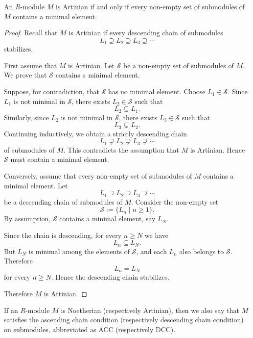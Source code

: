 \begin{lemma}
    An $R$-module $M$ is Artinian if and only if every non-empty set of
    submodules of $M$ contains a minimal element.
\end{lemma}

\begin{proof}
    Recall that $M$ is Artinian if every descending chain of submodules
    \[
        L_1 \supseteq L_2 \supseteq L_3 \supseteq \cdots
    \]
    stabilizes.

    First assume that $M$ is Artinian. Let $\mathcal{S}$ be a non-empty set
    of submodules of $M$. We prove that $\mathcal{S}$ contains a minimal
    element.

    Suppose, for contradiction, that $\mathcal{S}$ has no minimal element.
    Choose $L_1\in \mathcal{S}$. Since $L_1$ is not minimal in $\mathcal{S}$,
    there exists $L_2\in \mathcal{S}$ such that
    \[
        L_2 \subsetneq L_1.
    \]
    Similarly, since $L_2$ is not minimal in $\mathcal{S}$, there exists
    $L_3\in \mathcal{S}$ such that
    \[
        L_3 \subsetneq L_2.
    \]
    Continuing inductively, we obtain a strictly descending chain
    \[
        L_1 \supsetneq L_2 \supsetneq L_3 \supsetneq \cdots
    \]
    of submodules of $M$. This contradicts the assumption that $M$ is
    Artinian. Hence $\mathcal{S}$ must contain a minimal element.

    Conversely, assume that every non-empty set of submodules of $M$ contains
    a minimal element. Let
    \[
        L_1 \supseteq L_2 \supseteq L_3 \supseteq \cdots
    \]
    be a descending chain of submodules of $M$. Consider the non-empty set
    \[
        \mathcal{S}:=\{L_n \mid n\geq 1\}.
    \]
    By assumption, $\mathcal{S}$ contains a minimal element, say $L_N$.

    Since the chain is descending, for every $n\geq N$ we have
    \[
        L_n \subseteq L_N.
    \]
    But $L_N$ is minimal among the elements of $\mathcal{S}$, and each $L_n$
    also belongs to $\mathcal{S}$. Therefore
    \[
        L_n = L_N
    \]
    for every $n\geq N$. Hence the descending chain stabilizes.

    Therefore $M$ is Artinian.
\end{proof}

\begin{remark}
    If an $R$-module $M$ is Noetherian (respectively Artinian), then we also say that $M$ satisfies the ascending chain condition (respectively descending chain condition) on
    submodules, abbreviated as ACC (respectively DCC).
\end{remark}


